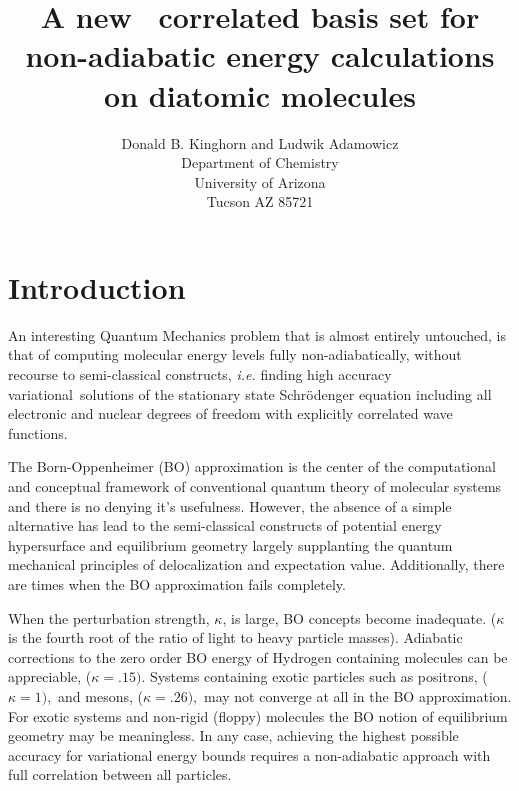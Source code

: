 \documentclass[12pt,doublespace]{article}
\begin{document}
\title{A new \ correlated basis set for non-adiabatic energy calculations on
diatomic molecules}
\author{Donald B. Kinghorn and Ludwik Adamowicz \\
Department of Chemistry\\
University of Arizona\\
Tucson AZ 85721}
\maketitle

\begin{abstract}
\end{abstract}

\section{Introduction}

An interesting  Quantum Mechanics problem that is almost entirely untouched,
is that of computing molecular energy levels fully non-adiabatically,
without recourse to semi-classical constructs, \textit{i.e.} finding high
accuracy variational\ solutions of the stationary state Schr\"{o}denger
equation including all electronic and nuclear degrees of freedom with
explicitly correlated wave functions. 

The Born-Oppenheimer (BO) approximation is the center of the computational
and conceptual framework of conventional quantum theory of molecular systems
and there is no denying it's usefulness. However, the absence of a simple
alternative has lead to the semi-classical constructs of potential energy
hypersurface and equilibrium geometry largely supplanting the quantum
mechanical principles of delocalization and expectation value. Additionally,
there are times when the BO approximation fails completely.

When the perturbation strength, $\kappa $,  is large, BO concepts become
inadequate. ($\kappa $ is the fourth root of the ratio of light to heavy
particle masses). Adiabatic corrections to the zero order BO energy of
Hydrogen containing molecules can be appreciable, ($\kappa =.15)$. Systems
containing exotic particles such as positrons, ($\kappa =1),$ and mesons, ($%
\kappa =.26),$ may not converge at all in the BO approximation. For exotic
systems and non-rigid (floppy) molecules the BO notion of equilibrium
geometry may be meaningless.  In any case, achieving the highest possible
accuracy for variational energy bounds requires a non-adiabatic approach
with full correlation between all particles. 
\end{document}

